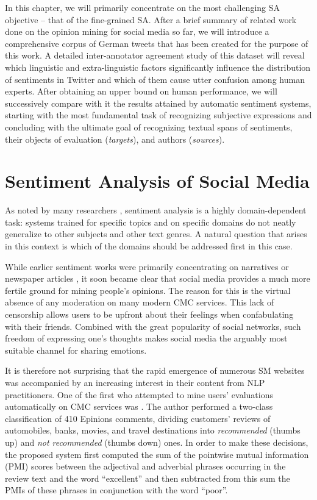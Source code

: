 In this chapter, we will primarily concentrate on the most challenging
SA objective -- that of the fine-grained SA.  After a brief summary of
related work done on the opinion mining for social media so far, we
will introduce a comprehensive corpus of German tweets that has been
created for the purpose of this work.  A detailed inter-annotator
agreement study of this dataset will reveal which linguistic and
extra-linguistic factors significantly influence the distribution of
sentiments in Twitter and which of them cause utter confusion among
human experts.  After obtaining an upper bound on human performance,
we will successively compare with it the results attained by automatic
sentiment systems, starting with the most fundamental task of
recognizing subjective expressions and concluding with the ultimate
goal of recognizing textual spans of sentiments, their objects of
evaluation (\emph{targets}), and authors (\emph{sources}).

\section{Sentiment Analysis of Social Media}
As noted by many researchers \citep{Aue:05,Blitzer:07,Jakob:10},
sentiment analysis is a highly domain-dependent task: systems trained
for specific topics and on specific domains do not neatly generalize
to other subjects and other text genres.  A natural question that
arises in this context is which of the domains should be addressed
first in this case.

While earlier sentiment works were primarily concentrating on
narratives \citep{Wiebe:90a,Wiebe:94} or newspaper articles
\citep{Wiebe:03,Wiebe:05}, it soon became clear that social media
provides a much more fertile ground for mining people's opinions.  The
reason for this is the virtual absence of any moderation on many
modern CMC services.  This lack of censorship allows users to be
upfront about their feelings when confabulating with their friends.
Combined with the great popularity of social networks, such freedom of
expressing one's thoughts makes social media the arguably most
suitable channel for sharing emotions.

It is therefore not surprising that the rapid emergence of numerous SM
websites was accompanied by an increasing interest in their content
from NLP practitioners.  One of the first who attempted to mine users'
evaluations automatically on CMC services was \citet{Turney:02}.  The
author performed a two-class classification of 410 Epinions comments,
dividing customers' reviews of automobiles, banks, movies, and travel
destinations into \emph{recommended} (thumbs up) and \emph{not
  recommended} (thumbs down) ones.  In order to make these decisions,
the proposed system first computed the sum of the pointwise mutual
information (PMI) scores between the adjectival and adverbial phrases
occurring in the review text and the word ``excellent'' and then
subtracted from this sum the PMIs of these phrases in conjunction with
the word ``poor''.

